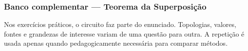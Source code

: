 \subsubsection*{Banco complementar --- Teorema da Superposição}
\begin{atencao}
Nos exercícios práticos, o circuito faz parte do enunciado. Topologias, valores,
fontes e grandezas de interesse variam de uma questão para outra. A repetição é
usada apenas quando pedagogicamente necessária para comparar métodos.
\end{atencao}




\begingroup
\newcount\fvSupNDoisCircuitCount
{}
\let\fvSupNDoisCircuitoOriginal\circuitoq
\renewcommand{\circuitoq}[1]{%
  \global\advance\fvSupNDoisCircuitCount by 1\relax
  \ifnum\fvSupNDoisCircuitCount=3\relax
    \fvSupNDoisCircuitoOriginal{\fvSupNDoisQTresRevisada}%
  \else\ifnum\fvSupNDoisCircuitCount=5\relax
    \fvSupNDoisCircuitoOriginal{\fvSupNDoisQCincoRevisada}%
  \else
    \fvSupNDoisCircuitoOriginal{#1}%
  \fi\fi}

\endgroup



